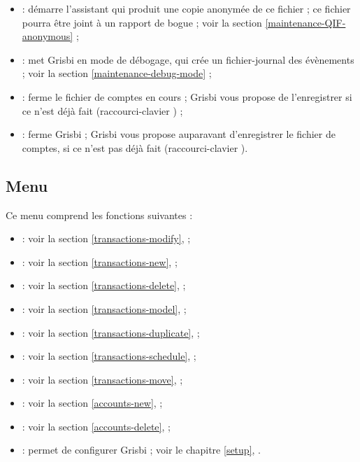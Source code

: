 \begin{itemize}
	\item {} : démarre l'assistant qui produit une copie anonymée de ce fichier ; ce fichier pourra être joint à un rapport de bogue ; voir la section \vref{maintenance-QIF-anonymous} ;	
	\item {} : met Grisbi en mode de débogage, qui crée un fichier-journal des évènements ; voir la section \vref{maintenance-debug-mode} ; 	
	\item {} : ferme le fichier de comptes en cours ; Grisbi vous propose de l'enregistrer si ce n'est déjà fait (raccourci-clavier ) ;
	\item {} : ferme Grisbi ; Grisbi vous propose auparavant d'enregistrer le fichier de comptes, si ce n'est pas déjà fait (raccourci-clavier ).
\end{itemize}


\subsection{Menu \label{home-menus-edit}}

Ce menu comprend les fonctions suivantes :

\begin{itemize}
	\item {} : voir la section \vref{transactions-modify},  ;
	\item {} : voir la section \vref{transactions-new},  ;
	\item {} : voir la section \vref{transactions-delete},  ;
	\item {} : voir la section \vref{transactions-model},  ;
	\item {} : voir la section \vref{transactions-duplicate},  ;
	\item {} : voir la section \vref{transactions-schedule},  ;
	\item {} : voir la section \vref{transactions-move},  ;
	\item {} : voir la section \vref{accounts-new},  ;
	\item {} : voir la section \vref{accounts-delete},  ;
	\item {} : permet de configurer Grisbi ; voir le chapitre \vref{setup}, .
\end{itemize}


